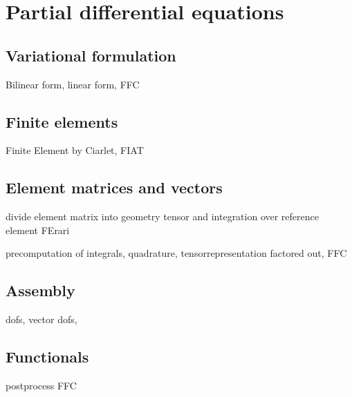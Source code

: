 \chapter{Partial differential equations}

\section{Variational formulation}

Bilinear form, linear form, FFC

\section{Finite elements}

Finite Element by Ciarlet, FIAT 

\section{Element matrices and vectors} 

divide element matrix into geometry tensor and integration 
over reference element FErari

precomputation of integrals, quadrature, tensorrepresentation factored out, FFC 

\section{Assembly}

dofs, vector dofs, 

\section{Functionals}

postprocess FFC 


